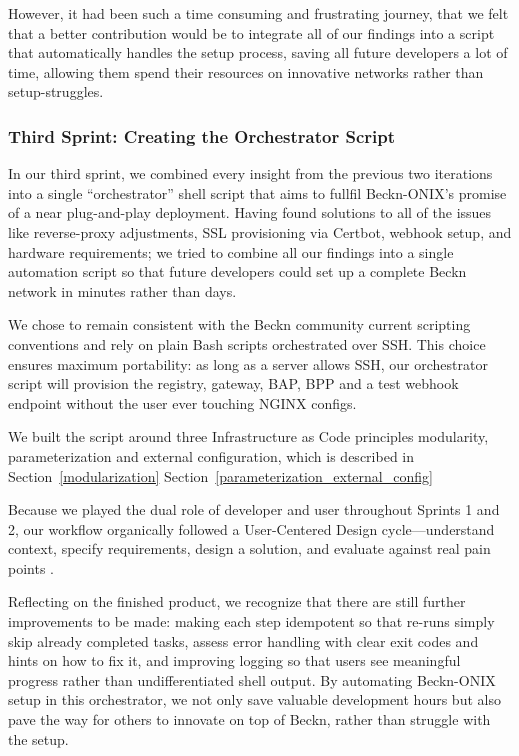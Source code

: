 However, it had been such a time consuming and frustrating journey, that we felt that a better contribution would be to integrate all of our findings into a script that automatically handles the setup process, saving all future developers a lot of time, allowing them spend their resources on innovative networks rather than setup-struggles. 
\subsubsection{Third Sprint: Creating the Orchestrator Script}
\label{third_sprint}
In our third sprint, we combined every insight from the previous two iterations into a single “orchestrator” shell script that aims to fullfil Beckn-ONIX’s promise of a near plug-and-play deployment. Having found solutions to all of the issues like reverse-proxy adjustments, SSL provisioning via Certbot, webhook setup, and hardware requirements; we tried to combine all our findings into a single automation script so that future developers could set up a complete Beckn network in minutes rather than days.

We chose to remain consistent with the Beckn community current scripting conventions and rely on plain Bash scripts orchestrated over SSH. This choice ensures maximum portability: as long as a server allows SSH, our orchestrator script will provision the registry, gateway, BAP, BPP and a test webhook endpoint without the user ever touching NGINX configs.

We built the script around three Infrastructure as Code principles modularity, parameterization and external configuration, which is described in Section~\ref{modularization} Section~\ref{parameterization_external_config}

Because we played the dual role of developer and user throughout Sprints 1 and 2, our workflow organically followed a User-Centered Design cycle—understand context, specify requirements, design a solution, and evaluate against real pain points \citep{norman_1986}.

Reflecting on the finished product, we recognize that there are still further improvements to be made: making each step idempotent so that re-runs simply skip already completed tasks, assess error handling with clear exit codes and hints on how to fix it, and improving logging so that users see meaningful progress rather than undifferentiated shell output. By automating Beckn-ONIX setup in this orchestrator, we not only save valuable development hours but also pave the way for others to innovate on top of Beckn, rather than struggle with the setup.

